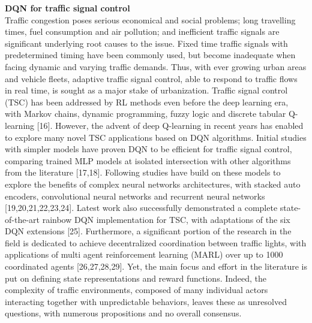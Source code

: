 \textbf{DQN for traffic signal control} \\
Traffic congestion poses serious economical and social problems; long travelling times, fuel consumption and air pollution; and inefficient traffic signals are significant underlying root causes to the issue. Fixed time traffic signals with predetermined timing have been commonly used, but become inadequate when facing dynamic and varying traffic demands. Thus, with ever growing urban areas and vehicle fleets, adaptive traffic signal control, able to respond to traffic flows in real time, is sought as a major stake of urbanization.
Traffic signal control (TSC) has been addressed by RL methods even before the deep learning era, with Markov chains, dynamic programming, fuzzy logic and discrete tabular Q-learning [16]. However, the advent of deep Q-learning in recent years has enabled to explore many novel TSC applications based on DQN algorithms. Initial studies with simpler models have proven DQN to be efficient for traffic signal control, comparing trained MLP models at isolated intersection with other algorithms from the literature [17,18]. Following studies have build on these models to explore the benefits of complex neural networks architectures, with stacked auto encoders, convolutional neural networks and recurrent neural networks [19,20,21,22,23,24]. Latest work also successfully demonstrated a complete state-of-the-art rainbow DQN implementation for TSC, with adaptations of the six DQN extensions [25]. Furthermore, a significant portion of the research in the field is dedicated to achieve decentralized coordination between traffic lights, with applications of multi agent reinforcement learning (MARL) over up to 1000 coordinated agents [26,27,28,29]. Yet, the main focus and effort in the literature is put on defining state representations and reward functions. Indeed, the complexity of traffic environments, composed of many individual actors interacting together with unpredictable behaviors, leaves these as unresolved questions, with numerous propositions and no overall consensus. \\

